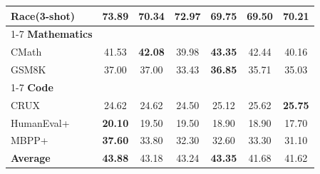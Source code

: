 \begin{table}[t!]
{\begin{tabular}{lcc|cccc}
        Race(3-shot)       & \textbf{73.89} & 70.34 & \textbf{72.97} & 69.75 & 69.50 & 70.21 \\
        \cmidrule(lr){1-7}
        \textbf{Mathematics} &  &  &  &  &  &    \\
        CMath              & 41.53 & \textbf{42.08} & 39.98 & \textbf{43.35} & 42.44 & 40.16 \\
        GSM8K              & 37.00 & 37.00 & 33.43 & \textbf{36.85} & 35.71 & 35.03 \\
        \cmidrule(lr){1-7}
        \textbf{Code} &  &  &  &  &  &    \\
        CRUX               & 24.62 & 24.62 & 24.50 & 25.12 & 25.62 & \textbf{25.75} \\
        HumanEval+         & \textbf{20.10} & 19.50 & 19.50 & 18.90 & 18.90 & 17.70 \\
        MBPP+              & \textbf{37.60} & 33.80 & 32.30 & 32.60 & 33.30 & 31.10 \\
        \rowcolor{blue!10}
        \textbf{Average}   & \textbf{43.88} & 43.18 & 43.24 & \textbf{43.35} & 41.68 & 41.62 \\
        \bottomrule
        \end{tabular} }
        \label{tab:olmo3_indomain}
\end{table}

